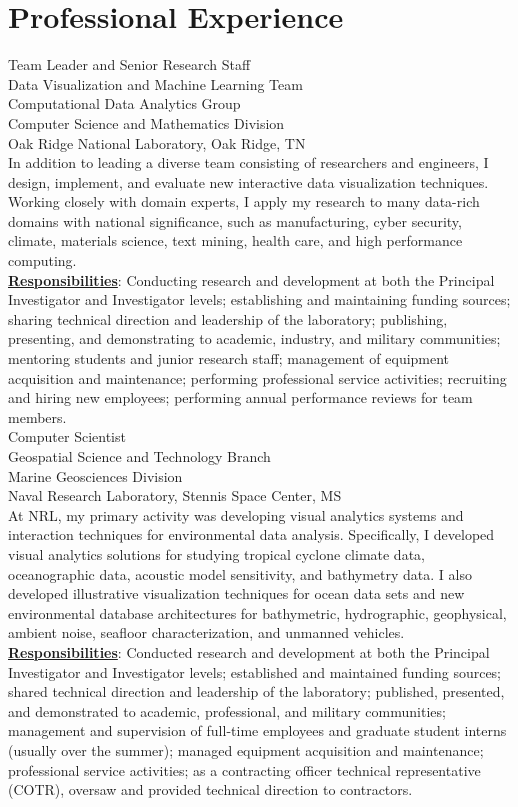 \documentclass[11pt, letterpaper]{article}
\newcommand{\years}[1]{\marginnote{\scriptsize #1}}
\begin{document}
\newpage
\section*{Professional Experience}
\noindent\years{2010--present}Team Leader and Senior Research Staff\\
Data Visualization and Machine Learning Team\\
Computational Data Analytics Group\\
Computer Science and Mathematics Division\\
Oak Ridge National Laboratory, Oak Ridge, TN\\[.2cm]
In addition to leading a diverse team consisting of researchers and engineers, I
design, implement, and evaluate new interactive data
visualization techniques.  Working closely with domain experts, I apply my
research to many data-rich domains with national significance, such as
manufacturing, cyber security, climate, materials science, text
mining, health care, and high performance computing.\\
\textbf{\underline{Responsibilities}}: Conducting research and
development at both the Principal Investigator and Investigator levels;
establishing and maintaining funding sources; sharing technical direction and
leadership of the laboratory; publishing, presenting, and demonstrating to
academic, industry, and military communities; mentoring students and junior
research staff; management of equipment acquisition and maintenance;
performing professional service activities; recruiting and hiring new
employees; performing annual performance reviews for team members.\\

\years{2001-2010}Computer Scientist\\
Geospatial Science and Technology Branch\\
Marine Geosciences Division\\
Naval Research Laboratory, Stennis Space Center, MS\\[.2cm]
At NRL, my primary activity was developing visual analytics systems and
interaction techniques for environmental data analysis.  Specifically, I
developed visual analytics solutions for studying tropical cyclone climate
data, oceanographic data, acoustic model sensitivity, and bathymetry data.  I
also developed illustrative visualization techniques for ocean data sets and
new environmental database architectures for bathymetric, hydrographic,
geophysical, ambient noise, seafloor characterization, and unmanned vehicles.\\
\textbf{\underline{Responsibilities}}:  Conducted research and development at both the
Principal Investigator and Investigator levels; established and maintained
funding sources; shared technical direction and leadership of the
laboratory; published, presented, and demonstrated to academic, professional,
and military communities; management and supervision of full-time employees
and graduate student interns (usually over the summer); managed equipment
acquisition and maintenance; professional service activities; as a contracting
officer technical representative (COTR), oversaw and provided technical
direction to contractors.\\
\end{document}
